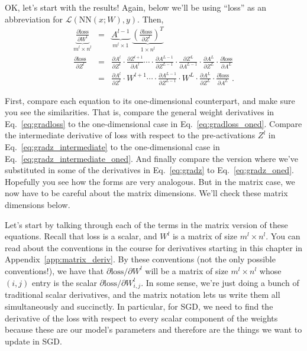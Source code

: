 OK, let's start with the results! Again, below we'll be using ``loss'' as an abbreviation for $\mathcal{L}(\text{NN}(x;W),y)$. Then,
\begin{eqnarray}
  \label{eq:gradloss}
  \underbrace{\frac{\partial \text{loss}}{\partial W^l}}_{m^l \times n^l}
  &=&
  \underbrace{A^{l-1}}_{m^l \times 1} \;
  \underbrace{\left(\frac{\partial \text{loss}}{\partial
      Z^l}\right)^T}_{1 \times n^l} \\
  \label{eq:gradz_intermediate}
  \frac{\partial \text{loss}}{\partial Z^l}
  &=& \frac{\partial A^l}{\partial Z^l}
  \cdot \frac{\partial Z^{l+1}}{ \partial A^l}
  \cdots
  \cdot \frac{\partial A^{L-1}}{\partial Z^{L-1}}
  \cdot \frac{\partial Z^{L}}{\partial A^{L-1}}
  \cdot \frac{\partial A^{L}}{\partial Z^{L}}
  \cdot \frac{\partial \text{loss}}{\partial A^L}
  \\
  \label{eq:gradz}
  &=& \frac{\partial A^l}{\partial Z^l}
  \cdot W^{l+1}
  \cdots
  \cdot \frac{\partial A^{L-1}}{\partial Z^{L-1}}
  \cdot W^{L}
  \cdot \frac{\partial A^{L}}{\partial Z^{L}}
  \cdot \frac{\partial \text{loss}}{\partial A^L} \; .
\end{eqnarray}

First, compare each equation to its one-dimensional counterpart, and make sure you see the similarities.
That is, compare the general weight derivatives in Eq.~\ref{eq:gradloss} to the one-dimensional case in Eq.~\ref{eq:gradloss_oned}. Compare the intermediate derivative of loss with respect to the pre-activations $Z^l$ in Eq.~\ref{eq:gradz_intermediate} to the one-dimensional case in Eq.~\ref{eq:gradz_intermediate_oned}. And finally compare the version where we've substituted in some of the derivatives in Eq.~\ref{eq:gradz} to Eq.~\ref{eq:gradz_oned}. Hopefully you see how the forms are very analogous. But in the matrix case, we now have to be careful about the matrix dimensions. We'll check these matrix dimensions below.

Let's start by talking through each of the terms in the matrix version of these equations. Recall that loss is a scalar, and $W^l$ is a matrix of size $m^l \times n^l$. You can read about the conventions in the course for derivatives starting in this chapter in Appendix~\ref{app:matrix_deriv}. By these conventions (not the only possible conventions!), we have that $\partial \text{loss} / \partial W^l$ will be a matrix of size $m^l \times n^l$ whose $(i,j)$ entry is the scalar $\partial \text{loss} / \partial W^l_{i,j}$. In some sense, we're just doing a bunch of traditional scalar derivatives, and the matrix notation lets us write them all simultaneously and succinctly. In particular, for SGD, we need to find the derivative of the loss with respect to every scalar component of the weights because these are our model's parameters and therefore are the things we want to update in SGD.

